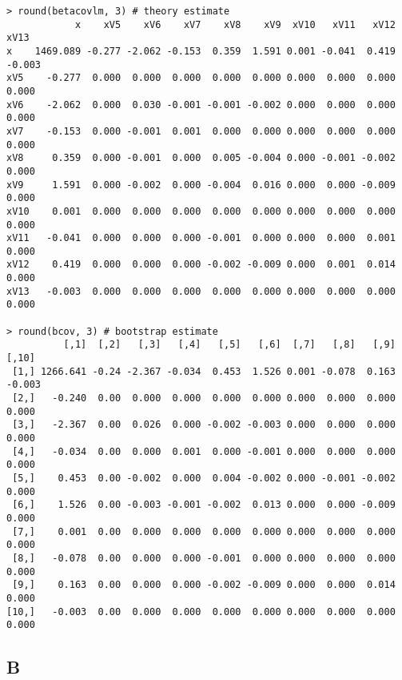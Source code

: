 \documentclass{article}
\begin{document}
\begin{verbatim}
> round(betacovlm, 3) # theory estimate
            x    xV5    xV6    xV7    xV8    xV9  xV10   xV11   xV12   xV13
x    1469.089 -0.277 -2.062 -0.153  0.359  1.591 0.001 -0.041  0.419 -0.003
xV5    -0.277  0.000  0.000  0.000  0.000  0.000 0.000  0.000  0.000  0.000
xV6    -2.062  0.000  0.030 -0.001 -0.001 -0.002 0.000  0.000  0.000  0.000
xV7    -0.153  0.000 -0.001  0.001  0.000  0.000 0.000  0.000  0.000  0.000
xV8     0.359  0.000 -0.001  0.000  0.005 -0.004 0.000 -0.001 -0.002  0.000
xV9     1.591  0.000 -0.002  0.000 -0.004  0.016 0.000  0.000 -0.009  0.000
xV10    0.001  0.000  0.000  0.000  0.000  0.000 0.000  0.000  0.000  0.000
xV11   -0.041  0.000  0.000  0.000 -0.001  0.000 0.000  0.000  0.001  0.000
xV12    0.419  0.000  0.000  0.000 -0.002 -0.009 0.000  0.001  0.014  0.000
xV13   -0.003  0.000  0.000  0.000  0.000  0.000 0.000  0.000  0.000  0.000

> round(bcov, 3) # bootstrap estimate
          [,1]  [,2]   [,3]   [,4]   [,5]   [,6]  [,7]   [,8]   [,9]  [,10]
 [1,] 1266.641 -0.24 -2.367 -0.034  0.453  1.526 0.001 -0.078  0.163 -0.003
 [2,]   -0.240  0.00  0.000  0.000  0.000  0.000 0.000  0.000  0.000  0.000
 [3,]   -2.367  0.00  0.026  0.000 -0.002 -0.003 0.000  0.000  0.000  0.000
 [4,]   -0.034  0.00  0.000  0.001  0.000 -0.001 0.000  0.000  0.000  0.000
 [5,]    0.453  0.00 -0.002  0.000  0.004 -0.002 0.000 -0.001 -0.002  0.000
 [6,]    1.526  0.00 -0.003 -0.001 -0.002  0.013 0.000  0.000 -0.009  0.000
 [7,]    0.001  0.00  0.000  0.000  0.000  0.000 0.000  0.000  0.000  0.000
 [8,]   -0.078  0.00  0.000  0.000 -0.001  0.000 0.000  0.000  0.000  0.000
 [9,]    0.163  0.00  0.000  0.000 -0.002 -0.009 0.000  0.000  0.014  0.000
[10,]   -0.003  0.00  0.000  0.000  0.000  0.000 0.000  0.000  0.000  0.000
\end{verbatim}

\subsection*{B}
\end{document}

